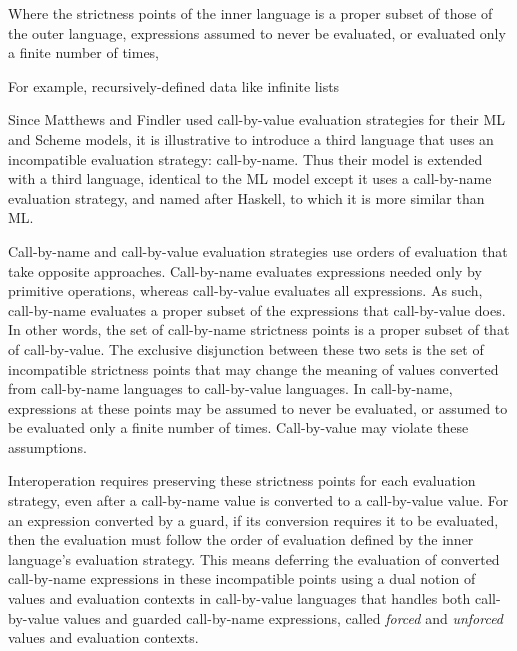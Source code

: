 Where the strictness points of the inner language is a proper subset of those of the outer language, expressions assumed to never be evaluated, or evaluated only a finite number of times, 



For example, recursively-defined data like infinite lists

Since Matthews and Findler used call-by-value evaluation strategies for their ML and Scheme models, it is illustrative to introduce a third language that uses an incompatible evaluation strategy: call-by-name. Thus their model is extended with a third language, identical to the ML model except it uses a call-by-name evaluation strategy, and named after Haskell, to which it is more similar than ML.

Call-by-name and call-by-value evaluation strategies use orders of evaluation that take opposite approaches. Call-by-name evaluates expressions needed only by primitive operations, whereas call-by-value evaluates all expressions. As such, call-by-name evaluates a proper subset of the expressions that call-by-value does. In other words, the set of call-by-name strictness points is a proper subset of that of call-by-value. The exclusive disjunction between these two sets is the set of incompatible strictness points that may change the meaning of values converted from call-by-name languages to call-by-value languages. In call-by-name, expressions at these points may be assumed to never be evaluated, or assumed to be evaluated only a finite number of times. Call-by-value may violate these assumptions.

Interoperation requires preserving these strictness points for each evaluation strategy, even after a call-by-name value is converted to a call-by-value value. For an expression converted by a guard, if its conversion requires it to be evaluated, then the evaluation must follow the order of evaluation defined by the inner language's evaluation strategy. This means deferring the evaluation of converted call-by-name expressions in these incompatible points using a dual notion of values and evaluation contexts in call-by-value languages that handles both call-by-value values and guarded call-by-name expressions, called \emph{forced} and \emph{unforced} values and evaluation contexts.